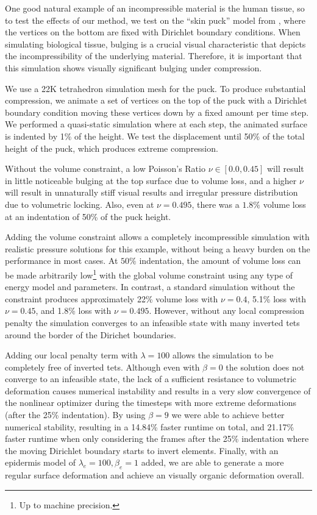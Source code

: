 One good natural example of an incompressible material is the human tissue, so to test the effects of our method, we test on the ``skin puck'' model from \cite{Pai:2018}, where the vertices on the bottom are fixed with Dirichlet boundary conditions. 
When simulating biological tissue, bulging is a crucial visual characteristic that depicts the incompressibility of the underlying material. 
Therefore, it is important that this simulation shows visually significant bulging under compression.

We use a 22K tetrahedron simulation mesh for the puck.  To produce substantial compression, we animate a set of vertices on the top of the puck with a Dirichlet boundary condition moving these vertices down by a fixed amount per time step. We performed a quasi-static simulation where at each step, the animated surface is indented by 1\% of the height. We test the displacement until 50\% of the total height of the puck, which produces extreme compression.

Without the volume constraint, a low Poisson's Ratio $\nu \in [0.0, 0.45]$ will result in little noticeable bulging at the top surface due to volume loss, and a higher $\nu$ will result in unnaturally stiff visual results and irregular pressure distribution due to volumetric locking. Also, even at $\nu = 0.495$, there was a $1.8\%$ volume loss at an indentation of 50\% of the puck height.

Adding the volume constraint allows a completely incompressible simulation with realistic pressure solutions for this example, without being a heavy burden on the performance in most cases. At $50\%$ indentation, the amount of volume loss can be made arbitrarily low\footnote{Up to machine precision.} with the global volume constraint using any type of energy model and parameters. In contrast, a standard simulation without the constraint produces approximately 22\% volume loss with $\nu = 0.4$, 5.1\% loss with $\nu = 0.45$, and 1.8\% loss with $\nu = 0.495$. However, without any local compression penalty the simulation converges to an infeasible state with many inverted tets around the border of the Dirichet boundaries.

Adding our local penalty term with $\lambda = 100$ allows the simulation to be completely free of inverted tets. Although even with $\beta = 0$ the solution does not converge to an infeasible state, the lack of a sufficient resistance to volumetric deformation causes numerical instability and results in a very slow convergence of the nonlinear optimizer during the timesteps with more extreme deformations (after the 25\% indentation). By using $\beta = 9$ we were able to achieve better numerical stability, resulting in a 14.84\% faster runtime on total, and 21.17\% faster runtime when only considering the frames after the 25\% indentation where the moving Dirichlet boundary starts to invert elements. Finally, with an epidermis model of $\lambda_e = 100, \beta_e = 1$ added, we are able to generate a more regular surface deformation and achieve an visually organic deformation overall. 

